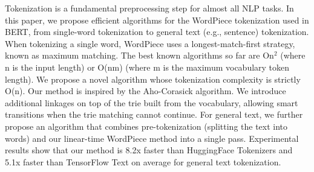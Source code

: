 Tokenization is a fundamental preprocessing step for almost all NLP tasks. In this paper, we propose efficient algorithms for the WordPiece tokenization used in BERT, from single-word tokenization to general text (e.g., sentence) tokenization. When tokenizing a single word, WordPiece uses a longest-match-first strategy, known as maximum matching. The best known algorithms so far are On$^2$ (where n is the input length) or O(nm) (where m is the maximum vocabulary token length). We propose a novel algorithm whose tokenization complexity is strictly O(n).  Our method is inspired by the Aho-Corasick algorithm. We introduce additional linkages on top of the trie built from the vocabulary, allowing smart transitions when the trie matching cannot continue.  For general text, we further propose an algorithm that combines pre-tokenization (splitting the text into words) and our linear-time WordPiece method into a single pass. Experimental results show that our method is 8.2x faster than HuggingFace Tokenizers and 5.1x faster than TensorFlow Text on average for general text tokenization.
